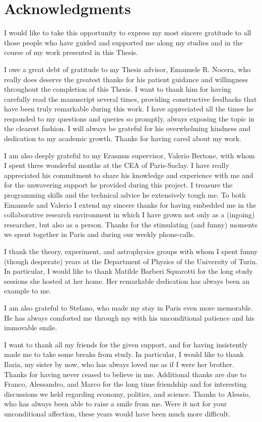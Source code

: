 \chapter*{Acknowledgments}
%
I would like to take this opportunity to express my most sincere gratitude to all those people who have guided and supported me along my studies and in the course of my work presented in this Thesis.\medbreak

\noindent I owe a great debt of gratitude to my Thesis advisor, Emanuele R. Nocera, who really does deserve the greatest thanks for his patient guidance and willingness throughout the completion of this Thesis. I want to thank him for having carefully read the manuscript several times, providing constructive feedbacks that have been truly remarkable during this work. I have appreciated all the times he responded to my questions and queries so promptly, always exposing the topic in the clearest fashion. I will always be grateful for his overwhelming kindness and dedication to my academic growth. Thanks for having cared about my work.  
\medbreak

\noindent I am also deeply grateful to my Erasmus supervisor, Valerio Bertone, with whom I spent three wonderful months at the CEA of Paris-Saclay. I have really appreciated his commitment to share his knowledge and experience with me and for the unwavering support he provided during this project. I treasure the programming skills and the technical advice he extensively tough me. To both Emanuele and Valerio I extend my sincere thanks for having embedded me in the collaborative research environment in which I have grown not only as a (ingoing) researcher, but also as a person. Thanks for the stimulating (and funny) moments we spent together in Paris and during our weekly phone-calls.\medbreak

\noindent I thank the theory, experiment, and astrophysics groups with whom I spent funny (though desperate) years at the Department of Physics of the University of Turin. In particular, I would like to thank Matilde Barberi Squarotti for the long study sessions she hosted at her home. Her remarkable dedication has always been an example to me.\medbreak

\noindent I am also grateful to Stefano, who made my stay in Paris even more memorable. He has always comforted me through my  with his unconditional patience and his immovable smile.\medbreak

\noindent I want to thank all my friends for the given support, and for having insistently made me to take some breaks from study. In particular, I would like to thank Ilaria, my sister by now, who has always loved me as if I were her brother. Thanks for having never ceased to believe in me. Additional thanks are due to Franco, Alessandro, and Marco for the long time friendship and for interesting discussions we held regarding economy, politics, and science. Thanks to Alessio, who has always been able to raise a smile from me. Were it not for your unconditional affection, these years would have been much more difficult.\medbreak

